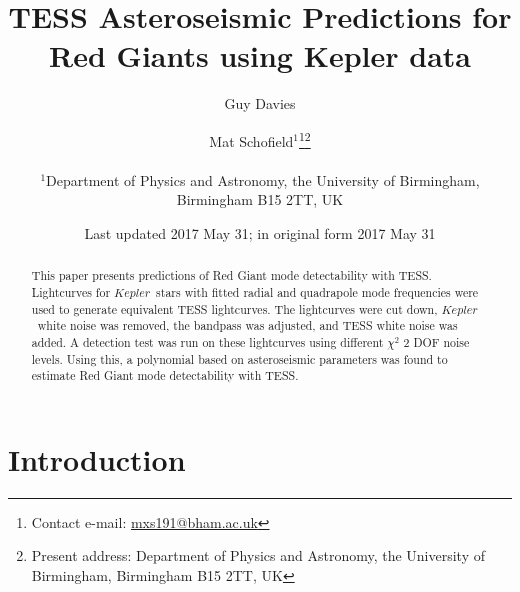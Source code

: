 \documentclass[a4paper,fleqn,usenatbib,useAMS]{mnras}
\title[TRG]{TESS Asteroseismic Predictions for Red Giants using Kepler data}
\author[Mat Schofield]{Mat Schofield$^{1}$\thanks{Contact e-mail: \href{mailto:mxs191@bham.ac.uk}{mxs191@bham.ac.uk}}\thanks{Present address: Department of Physics and Astronomy, the University of Birmingham, Birmingham B15 2TT, UK}
\author[Guy Davies]{Guy Davies}
\\
$^{1}$Department of Physics and Astronomy, the University of Birmingham, Birmingham B15 2TT, UK}
\date{Last updated 2017 May 31; in original form 2017 May 31}
\newcommand{\kep}{\ensuremath{Kepler}}
\begin{document}
\label{firstpage}
\pagerange{\pageref{firstpage}--\pageref{lastpage}}
\maketitle

\begin{abstract}
This paper presents predictions of Red Giant mode detectability with TESS. Lightcurves for \kep \ stars with fitted radial and quadrapole mode frequencies were used to generate equivalent TESS lightcurves. The lightcurves were cut down, \kep \ white noise was removed, the bandpass was adjusted, and TESS white noise was added. A detection test was run on these lightcurves using different $\chi^{2}$ 2 DOF noise levels. Using this, a polynomial based on asteroseismic parameters was found to estimate Red Giant mode detectability with TESS.
\end{abstract}

\begin{keywords}

\end{keywords}

\section{Introduction}




\bsp
\label{lastpage}
\end{document}
